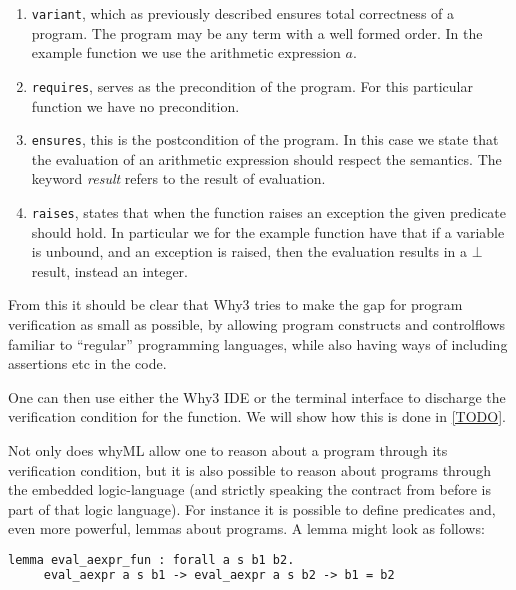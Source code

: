 \begin{enumerate}
  \item \texttt{variant}, which as previously described ensures total correctness of a program. The program may be any term with a well formed order. In the example function we use the arithmetic expression $a$.
  \item \texttt{requires}, serves as the precondition of the program. For this particular function we have no precondition.
  \item \texttt{ensures}, this is the postcondition of the program. In this case we state that the evaluation of an arithmetic expression should respect the semantics. The keyword \textit{result} refers to the result of evaluation.
  \item \texttt{raises}, states that when the function raises an exception the given predicate should hold. In particular we for the example function have that if a variable is unbound, and an exception is raised, then the evaluation results in a $\bot$ result, instead an integer.
\end{enumerate}

From this it should be clear that Why3 tries to make the gap for program verification as small
as possible, by allowing program constructs and controlflows familiar to ``regular''
programming languages, while also having ways of including assertions etc in the code.

One can then use either the Why3 IDE or the terminal interface to discharge the verification condition for the function. We will show how this is done in \autoref{TODO}.

Not only does whyML allow one to reason about a program through its verification condition,
but it is also possible to reason about programs through the embedded logic-language
(and strictly speaking the contract from before is part of that logic language).
For instance it is possible to define predicates and, even more powerful, lemmas about programs.
A lemma might look as follows:

\begin{lstlisting}[caption={Lemma stating determinism of arithmetic expressions},label={lst:why3fun},language=sml]
  lemma eval_aexpr_fun : forall a s b1 b2.
     eval_aexpr a s b1 -> eval_aexpr a s b2 -> b1 = b2
   \end{lstlisting}

